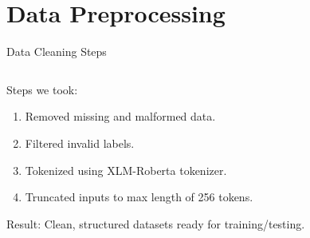 \documentclass[aspectratio=169]{beamer}
\begin{document}
\section{Data Preprocessing}
\begin{frame}{Data Cleaning Steps}
  \begin{columns}[T]
    \begin{column}{0.5\textwidth}
      Steps we took:
      \begin{enumerate}
        \item Removed missing and malformed data.
        \item Filtered invalid labels.
        \item Tokenized using XLM-Roberta tokenizer.
        \item Truncated inputs to max length of 256 tokens.
      \end{enumerate}
      Result: Clean, structured datasets ready for training/testing.
    \end{column}
    

\end{columns}
\end{frame}
\end{document}
